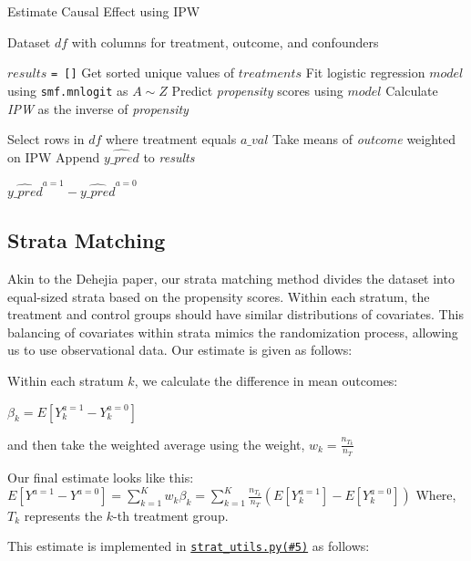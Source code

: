 \documentclass[12pt]{article}
\begin{document}
\begin{algorithm}[H]
\caption{Estimate Causal Effect using IPW}
\begin{algorithmic}[1]
\Require Dataset $df$ with columns for treatment, outcome, and confounders

\State $results$ {\tt = []}
\State Get sorted unique values of $treatments$
\State Fit logistic regression $model$ using {\tt smf.mnlogit} as $A \sim Z$
\State Predict \textit{propensity} scores using $model$
\State Calculate \textit{IPW} as the inverse of \textit{propensity}

    \State Select rows in $df$ where treatment equals $a\_val$
    \State Take means of \textit{outcome} weighted on \textit{}{IPW}
    \State Append $\hat{y\_pred}$ to \textit{results}
\EndFor

\State \Return $\hat{y\_pred}^{a=1} - \hat{y\_pred}^{a=0}$
\end{algorithmic}
\end{algorithm}

\subsection{Strata Matching}

Akin to the Dehejia paper, our strata matching method divides the dataset into equal-sized strata based on the propensity scores. Within each stratum, the treatment and control groups should have similar distributions of covariates. This balancing of covariates within strata mimics the randomization process, allowing us to use observational data. Our estimate is given as follows:

Within each stratum $k$, we calculate the difference in mean outcomes:

$\beta_{k} = E[Y^{a=1}_k - Y^{a=0}_k]$

and then take the weighted average using the weight, $w_k = \frac{n_{T_k}}{n_T}$

Our final estimate looks like this:
$E[Y^{a=1} - Y^{a=0}] = \sum_{k=1}^{K} w_k \beta_{k} = \sum_{k=1}^{K} \frac{n_{T_k}}{n_T} \left( E[Y^{a=1}_k] - E[Y^{a=0}_k] \right)$ Where, $T_k$ represents the $k$-th treatment group.

This estimate is implemented in \href{https://github.com/cs396s24/Proj-Job-Training/blob/main/utils/strat_utils.py#L5}{{\tt strat\_utils.py(\#5)}} as follows:
\end{document}
